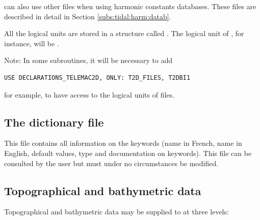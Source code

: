  can also use other files when using harmonic constants databases.
These files are described in detail in Section \ref{subs:tidal:harm:datab}.





All the logical units are stored in a structure called .
The logical unit of , for instance,
will be .

\begin{WarningBlock}{Note:}
 In some subroutines, it will be necessary to add
\begin{lstlisting}[language=TelFortran]
  USE DECLARATIONS_TELEMAC2D, ONLY: T2D_FILES, T2DBI1
\end{lstlisting}
 for example, to have access to the logical units of files.
\end{WarningBlock}

\subsection{The dictionary file}
\label{subs:dico:file}

This file contains all information on the keywords (name in French,
name in English, default values, type and documentation on keywords).
This file can be consulted by the user but must under no circumstances be
modified.


\subsection{Topographical and bathymetric data}
\label{subs:topo:bathy:data}
Topographical and bathymetric data may be supplied to  at three
levels:

